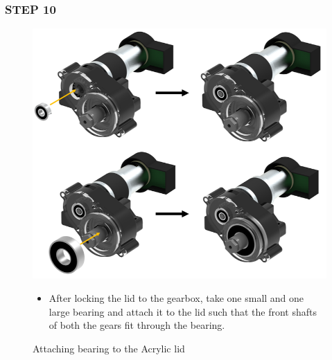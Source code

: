 \documentclass[12pt,a4paper,oneside]{book}
\begin{document}
			\subsubsection*{STEP 10}
				\begin{figure}[H]
					\begin{center}
						\includegraphics[scale=0.6]{ATTACHING FRONT BEARINGS TO GLASSLID}
						\caption{Attaching bearing to the Acrylic lid}
					\end{center}
					\begin{itemize}
						\item After locking the lid to the gearbox, take one small and one large bearing and attach it to the lid such that the front shafts of both the gears fit through the bearing. 
					\end{itemize}
				\end{figure}
				
\end{document}
